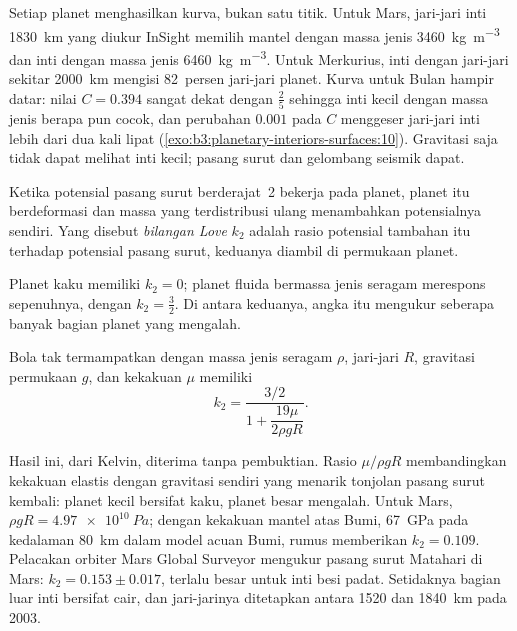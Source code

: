 Setiap planet menghasilkan kurva, bukan satu titik. Untuk Mars, jari-jari inti
\qty{1830}{km} yang diukur InSight memilih mantel dengan massa jenis \qty{3460}{kg.m^{-3}}
dan inti dengan massa jenis \qty{6460}{kg.m^{-3}}. Untuk Merkurius, inti dengan jari-jari sekitar
\qty{2000}{km} mengisi 82~persen jari-jari planet. Kurva untuk Bulan
hampir datar: nilai $C = 0.394$ sangat dekat dengan $\tfrac25$ sehingga inti kecil
dengan massa jenis berapa pun cocok, dan perubahan $0.001$ pada $C$ menggeser jari-jari inti
lebih dari dua kali lipat (\cref{exo:b3:planetary-interiors-surfaces:10}).
Gravitasi saja tidak dapat melihat inti kecil; pasang surut dan gelombang seismik dapat.

\begin{definition}\label{def:b3:planetary-interiors-surfaces:love-number}
Ketika potensial pasang surut berderajat~2 bekerja pada planet, planet itu berdeformasi dan
massa yang terdistribusi ulang menambahkan potensialnya sendiri. Yang disebut \emph{bilangan
Love} $k_2$ adalah rasio potensial tambahan itu terhadap
potensial pasang surut, keduanya diambil di permukaan planet.
\end{definition}

Planet kaku memiliki $k_2 = 0$; planet fluida bermassa jenis seragam merespons
sepenuhnya, dengan $k_2 = \tfrac32$. Di antara keduanya, angka itu mengukur seberapa
banyak bagian planet yang mengalah.

\begin{proposition}\label{prop:b3:planetary-interiors-surfaces:kelvin}
Bola tak termampatkan dengan massa jenis seragam $\rho$, jari-jari $R$, gravitasi permukaan
$g$, dan kekakuan $\mu$ memiliki
\[
  k_2 = \frac{3/2}{1 + \dfrac{19\mu}{2\rho g R}} .
\]
\end{proposition}

Hasil ini, dari Kelvin, diterima tanpa pembuktian. Rasio $\mu/\rho gR$ membandingkan
kekakuan elastis dengan gravitasi sendiri yang menarik tonjolan pasang surut
kembali: planet kecil bersifat kaku, planet besar mengalah. Untuk Mars, $\rho gR =
\qty{4.97e10}{Pa}$; dengan kekakuan mantel atas Bumi,
\qty{67}{GPa} pada kedalaman \qty{80}{km} dalam model acuan Bumi, rumus
memberikan $k_2 = 0.109$. Pelacakan orbiter Mars Global Surveyor
mengukur pasang surut Matahari di Mars: $k_2 = 0.153 \pm 0.017$, terlalu
besar untuk inti besi padat. Setidaknya bagian luar inti bersifat cair,
dan jari-jarinya ditetapkan antara 1520 dan \qty{1840}{km} pada 2003.

